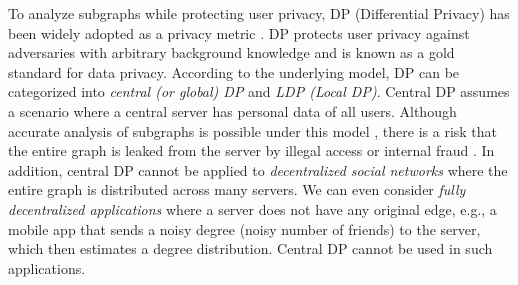 To analyze subgraphs while protecting user privacy, DP (Differential Privacy) \cite{DP} has been widely adopted as a privacy metric \cite{Ding_TKDE21,Imola_USENIX21,Karwa_PVLDB11,Sun_CCS19,Ye_ICDE20,Ye_TKDE21,Zhang_SIGMOD15}.
DP protects user privacy against adversaries with arbitrary background knowledge and is known as a gold standard for data privacy.
According to the underlying model, DP can be categorized into \textit{central (or global) DP} and \textit{LDP (Local DP)}.
Central DP assumes a scenario where
a central server has personal data of all users.
Although accurate analysis of subgraphs is possible under
this model \cite{Ding_TKDE21,Karwa_PVLDB11,Zhang_SIGMOD15}, there is a risk that the entire graph is leaked from the server by illegal access or internal fraud \cite{data_breach2021,CambridgeAnalytica}.
In addition, central DP cannot be applied to  \textit{decentralized social networks} 
\cite{Diaspora,Mastodon,Minds,Paul_CN14} 
where the entire graph is distributed across many servers. 
We can even consider 
\textit{fully decentralized applications} where a server does not have
any original edge, 
e.g., a mobile app that sends a noisy degree (noisy number of friends) to the server, which then estimates a degree distribution. 
Central DP cannot be used in such applications. 

